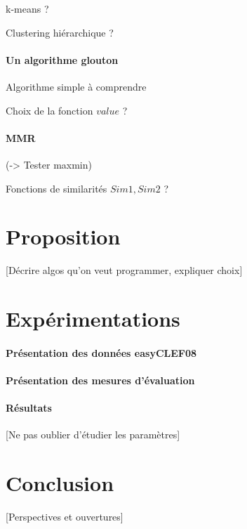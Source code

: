 \documentclass{article}
\begin{document}
\begin{multicols}{2}
k-means ?

Clustering hiérarchique ?


\paragraph{Un algorithme glouton}
Algorithme simple à comprendre

Choix de la fonction $value$ ?

\paragraph{MMR}
(-> Tester maxmin)

Fonctions de similarités $Sim1, Sim2$ ?


\section{Proposition}
[Décrire algos qu'on veut programmer, expliquer choix]


\section{Expérimentations}
\paragraph{Présentation des données easyCLEF08}

\paragraph{Présentation des mesures d'évaluation}

\paragraph{Résultats}
[Ne pas oublier d'étudier les paramètres]

\section{Conclusion}
[Perspectives et ouvertures]

\end{multicols}
\end{document}
